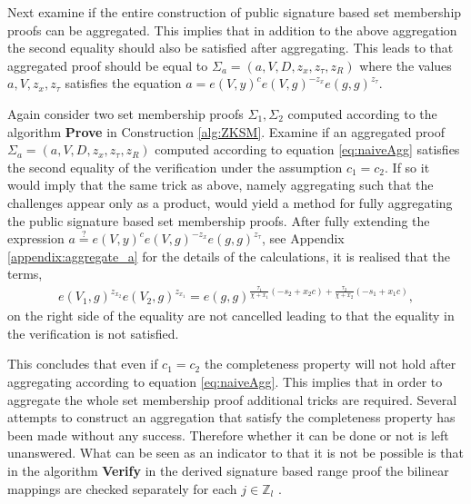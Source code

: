 Next examine if the entire construction of public signature based set membership proofs can be aggregated. This implies that in addition to the above aggregation the second equality should also be satisfied after aggregating. This leads to that aggregated proof should be equal to  $\Sigma_a = (a,V,D,z_x,z_\tau,z_R)$ where the values $a,V,z_x,z_\tau$ satisfies the equation $a = e(V,y)^c e(V,g)^{-z_x}e(g,g)^{z_\tau}$. 

Again consider two set membership proofs $\Sigma_1,\Sigma_2$ computed according to the algorithm \textbf{Prove} in Construction \ref{alg:ZKSM}. Examine if an aggregated proof $\Sigma_a= ( a, V, D, z_x, z_\tau, z_R)$ computed according to equation \eqref{eq:naiveAgg} satisfies the second equality of the verification under the assumption $c_1=c_2$. If so it would imply that the same trick as above, namely aggregating such that the challenges appear only as a product, would yield a method for fully aggregating the public signature based set membership proofs.  After fully extending the expression $a \overset{?}{=} e(V,y)^c e(V,g)^{-z_x}e(g,g)^{z_\tau}$, see Appendix \ref{appendix:aggregate_a} for the details of the calculations, it is realised that the terms,
\begin{align*}
e(V_1,g)^{z_{x_2}}e(V_2,g)^{z_{x_1}} = e(g,g)^{\frac{\tau_1}{\chi + x_1}(-s_2+x_2c) +\frac{\tau_2}{\chi + x_2}(-s_1+x_1c)   } ,
\end{align*}
on the right side of the equality are not cancelled leading to that the equality in the verification is not satisfied.

This concludes that even if $c_1=c_2$ the completeness property will not hold after aggregating according to equation \eqref{eq:naiveAgg}. This implies that in order to aggregate the whole set membership proof additional tricks are required. Several attempts to construct an aggregation that satisfy the completeness property has been made without any success. Therefore whether it can be done or not is left unanswered. What can be seen as an indicator to that it is not be possible is that in the algorithm \textbf{Verify} in the derived signature based range proof the bilinear mappings are checked separately for each $j\in\mathds{Z}_l$ \cite{Efficient_proof_interval}. 



